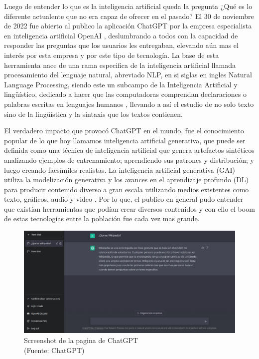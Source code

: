 \newpage

\par Luego de entender lo que es la inteligencia artificial queda la pregunta ¿Qué es lo diferente actualente que no era capaz de ofrecer en el pasado? 
El 30 de noviembre de 2022 fue abierto al publico la aplicación ChatGPT por la empresa especialista en inteligencia artificial OpenAI \cite{mt3}, deslumbrando a todos 
con la capacidad de responder las preguntas que los usuarios les entregaban, elevando aún mas el interés por esta empresa y por este tipo de tecnología.
La base de esta herramienta nace de una rama especifica de la inteligencia artificial llamada procesamiento del lenguaje 
natural, abreviado NLP, en si siglas en ingles Natural Language Processing, siendo este un subcampo de la Inteligencia Artificial y lingüístico, dedicado a hacer que las 
computadoras comprendan declaraciones o palabras escritas en lenguajes humanos \cite{nlpeda}, llevando a así el estudio de no solo texto sino de la lingüística y la sintaxis que los textos contienen.


\par El verdadero impacto que provocó ChatGPT en el mundo, fue el conocimiento popular de lo que hoy llamamos inteligencia 
artificial generativa, que puede ser definida como una técnica de inteligencia artificial que genera artefactos sintéticos analizando 
ejemplos de entrenamiento; aprendiendo sus patrones y distribución; y luego creando facsímiles realistas. La inteligencia 
artificial generativa (GAI) utiliza la modelización generativa y los avances en el aprendizaje profundo (DL) para producir 
contenido diverso a gran escala utilizando medios existentes como texto, gráficos, audio y video \cite{mt2}. Por lo que, el publico en
general pudo entender que existían herramientas que podían crear diversos contenidos y con ello el boom de estas tecnologías entre la población fue cada vez mas grande. 


\begin{figure}[ht!]
    \centering
    \includegraphics[width=.8\textwidth]{figures/ea2.png}
    \caption[Screenshot de la pagina de ChatGPT]{Screenshot de la pagina de ChatGPT \\
    {\scriptsize (Fuente: ChatGPT)}}

    \label{fig:ea2}
\end{figure}

